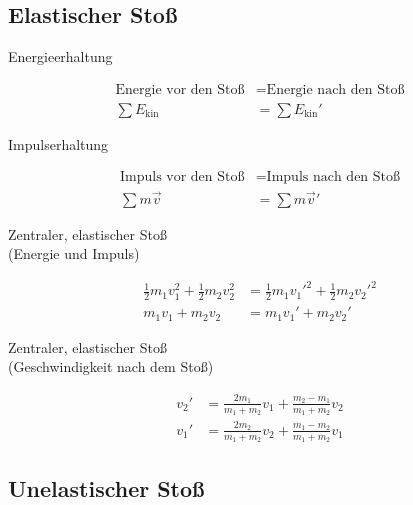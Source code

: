 \subsection{Elastischer Stoß}

\begin{boxleft}Energieerhaltung
\end{boxleft}\begin{boxrightshaded}
\begin{align}
\text{Energie vor den Stoß} &= \text{Energie nach den Stoß}\nonumber\\
\sum E_{\text{kin}}&=\sum E_{\text{kin}}'
\end{align}
\end{boxrightshaded}

\begin{boxleft}Impulserhaltung
\end{boxleft}\begin{boxrightshaded}
\begin{align}
\text{Impuls vor den Stoß} &= \text{Impuls nach den Stoß}\nonumber\\
\sum m\vec{v}&= \sum m\vec{v}'
\end{align}
\end{boxrightshaded}

\begin{boxleft}Zentraler, elastischer Stoß\\
(Energie und Impuls)
\end{boxleft}\begin{boxrightshaded}
\begin{align}
\frac{1}{2}m_1v_1^2+\frac{1}{2}m_2v_2^2&=\frac{1}{2}m_1v_1'^2+\frac{1}{2}m_2v_2'^2\\
m_1v_1+m_2v_2&=m_1v_1'+m_2v_2'
\end{align}
\end{boxrightshaded}

\begin{boxleft}Zentraler, elastischer Stoß\\
(Geschwindigkeit nach dem Stoß)
\end{boxleft}\begin{boxrightshaded}
\begin{align}
v_2'&=\frac{2m_1}{m_1+m_2}v_1+\frac{m_2-m_1}{m_1+m_2}v_2\\
v_1'&=\frac{2m_2}{m_1+m_2}v_2+\frac{m_1-m_2}{m_1+m_2}v_1
\end{align}
\end{boxrightshaded}

\subsection{Unelastischer Stoß}

